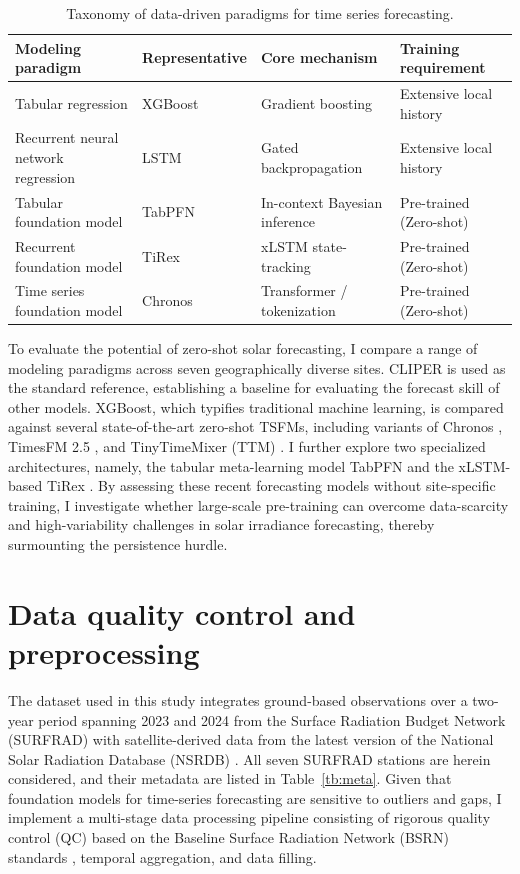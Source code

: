 \documentclass[number, 3p, 10pt, times]{elsarticle}
\begin{document}
\begin{table}[ht]
\centering
\caption{Taxonomy of data-driven paradigms for time series forecasting.}
\label{tb:summary}
\footnotesize
\begin{tabular}{@{}llll@{}}
\toprule
\textbf{Modeling paradigm} & \textbf{Representative} & \textbf{Core mechanism} & \textbf{Training requirement} \\ \midrule
Tabular regression & XGBoost & Gradient boosting & Extensive local history \\
Recurrent neural network regression & LSTM & Gated backpropagation & Extensive local history \\
Tabular foundation model & TabPFN & In-context Bayesian inference & Pre-trained (Zero-shot) \\
Recurrent foundation model & TiRex & xLSTM state-tracking & Pre-trained (Zero-shot) \\
Time series foundation model & Chronos & Transformer / tokenization & Pre-trained (Zero-shot) \\ \bottomrule
\end{tabular}
\end{table}

To evaluate the potential of zero-shot solar forecasting, I compare a range of modeling paradigms across seven geographically diverse sites. CLIPER is used as the standard reference, establishing a baseline for evaluating the forecast skill of other models. XGBoost, which typifies traditional machine learning, is compared against several state-of-the-art zero-shot TSFMs, including variants of Chronos \citep{Ansari2024}, TimesFM 2.5 \citep{Das2024}, and TinyTimeMixer (TTM) \citep{Ekambaram2024}. I further explore two specialized architectures, namely, the tabular meta-learning model TabPFN \citep{Hollmann2025} and the xLSTM-based TiRex \citep{Auer2025}. By assessing these recent forecasting models without site-specific training, I investigate whether large-scale pre-training can overcome data-scarcity and high-variability challenges in solar irradiance forecasting, thereby surmounting the persistence hurdle. 


\section{Data quality control and preprocessing}
The dataset used in this study integrates ground-based observations over a two-year period spanning 2023 and 2024 from the Surface Radiation Budget Network (SURFRAD) \citep{Augustine2000} with satellite-derived data from the latest version of the National Solar Radiation Database (NSRDB) \citep{XIE2023112195}. All seven SURFRAD stations are herein considered, and their metadata are listed in Table~\ref{tb:meta}. Given that foundation models for time-series forecasting are sensitive to outliers and gaps, I implement a multi-stage data processing pipeline consisting of rigorous quality control (QC) based on the Baseline Surface Radiation Network (BSRN) standards \citep{Forstinger2021}, temporal aggregation, and data filling. 
\end{document}
